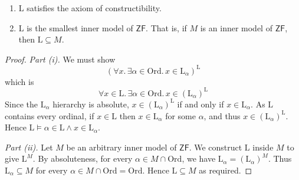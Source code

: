 \begin{theorem}
    \begin{enumerate}
        \item \( \mathrm{L} \) satisfies the axiom of constructibility.
        \item \( \mathrm{L} \) is the smallest inner model of \( \mathsf{ZF} \).
        That is, if \( M \) is an inner model of \( \mathsf{ZF} \), then \( \mathrm{L} \subseteq M \).
    \end{enumerate}
\end{theorem}
\begin{proof}
    \emph{Part (i).}
    We must show
    \[ (\forall x.\, \exists \alpha \in \mathrm{Ord}.\, x \in \mathrm{L}_\alpha)^{\mathrm{L}} \]
    which is
    \[ \forall x \in \mathrm{L}.\, \exists \alpha \in \mathrm{Ord}.\, x \in (\mathrm{L}_\alpha)^{\mathrm{L}} \]
    Since the \( \mathrm{L}_\alpha \) hierarchy is absolute, \( x \in (\mathrm{L}_\alpha)^{\mathrm{L}} \) if and only if \( x \in \mathrm{L}_\alpha \).
    As \( \mathrm{L} \) contains every ordinal, if \( x \in \mathrm{L} \) then \( x \in \mathrm{L}_\alpha \) for some \( \alpha \), and thus \( x \in (\mathrm{L}_\alpha)^{\mathrm{L}} \).
    Hence \( \mathrm{L} \vDash \alpha \in \mathrm{L} \wedge x \in \mathrm{L}_\alpha \).

    \emph{Part (ii).}
    Let \( M \) be an arbitrary inner model of \( \mathsf{ZF} \).
    We construct \( \mathrm{L} \) inside \( M \) to give \( \mathrm{L}^M \).
    By absoluteness, for every \( \alpha \in M \cap \mathrm{Ord} \), we have \( \mathrm{L}_\alpha = (\mathrm{L}_\alpha)^M \).
    Thus \( \mathrm{L}_\alpha \subseteq M \) for every \( \alpha \in M \cap \mathrm{Ord} = \mathrm{Ord} \).
    Hence \( \mathrm{L} \subseteq M \) as required.
\end{proof}

